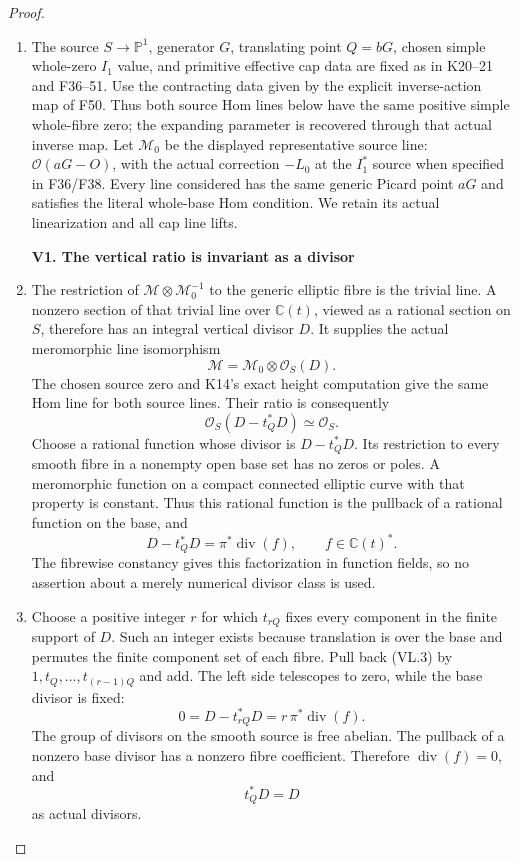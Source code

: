 \begin{proof}
\begin{enumerate}[label=\arabic*.]
\item The source \(S\to\mathbb P^1\), generator \(G\), translating point
\(Q=bG\), chosen simple whole-zero \(I_1\) value, and primitive
effective cap data are fixed as in K20--21 and F36--51.
Use the contracting data given by the explicit inverse-action map
of F50. Thus both source Hom lines below have the same positive
simple whole-fibre zero; the expanding parameter is recovered
through that actual inverse map.
Let \(\mathcal M_0\) be the displayed representative source line:
\(\mathcal O(aG-O)\), with the actual correction \(-L_0\) at
the \(I_1^*\) source when specified in F36/F38. Every line
considered has the same generic Picard point \(aG\) and satisfies
the literal whole-base Hom condition. We retain its actual
linearization and all cap line lifts.

\par

\medskip\noindent\textbf{V1. The vertical ratio is invariant as a divisor}

\par\nobreak

\item The restriction of \(\mathcal M\otimes\mathcal M_0^{-1}\) to the
generic elliptic fibre is the trivial line. A nonzero section of
that trivial line over \(\mathbb C(t)\), viewed as a rational
section on \(S\), therefore has an integral vertical divisor \(D\).
It supplies the actual meromorphic line isomorphism
\[
 \mathcal M=\mathcal M_0\otimes\mathcal O_S(D).
 \tag{VL.1}
\]
The chosen source zero and K14's exact height computation give
the same Hom line for both source lines. Their ratio is consequently
\[
 \mathcal O_S(D-t_Q^*D)\simeq\mathcal O_S.
 \tag{VL.2}
\]
Choose a rational function whose divisor is \(D-t_Q^*D\).
Its restriction to every smooth fibre in a nonempty open
base set has no zeros or poles. A meromorphic function on
a compact connected elliptic curve with that property is
constant. Thus this rational function is the pullback of
a rational function on the base, and
\[
 D-t_Q^*D=\pi^*\operatorname{div}(f),\qquad
                       f\in\mathbb C(t)^* .
 \tag{VL.3}
\]
The fibrewise constancy gives this factorization in function
fields, so no assertion about a merely numerical divisor
class is used.

\item Choose a positive integer \(r\) for which \(t_{rQ}\) fixes
every component in the finite support of \(D\). Such an
integer exists because translation is over the base and
permutes the finite component set of each fibre. Pull back
(VL.3) by \(1,t_Q,\ldots,t_{(r-1)Q}\) and add. The left
side telescopes to zero, while the base divisor is fixed:
\[
 0=D-t_{rQ}^*D=r\,\pi^*\operatorname{div}(f).
\]
The group of divisors on the smooth source is free abelian.
The pullback of a nonzero base divisor has a nonzero fibre
coefficient. Therefore \(\operatorname{div}(f)=0\), and
\[
                             t_Q^*D=D
 \tag{VL.4}
\]
as actual divisors.


\end{enumerate}
\end{proof}
